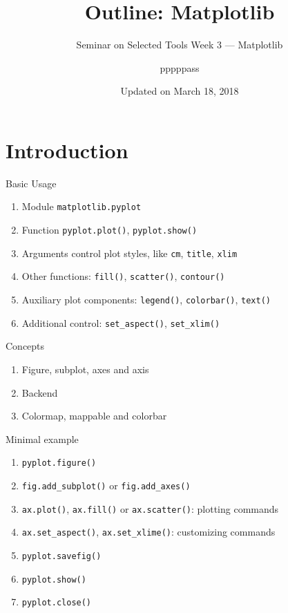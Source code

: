 \documentclass[english, nochinese]{../TeXTemplate/pkuslide}
\title{Outline: Matplotlib}
\subtitle{Seminar on Selected Tools Week 3 --- Matplotlib}
\author{pppppass}
\date{Updated on March 18, 2018}
\begin{document}
\begin{frame}
\titlepage
\end{frame}

\begin{frame}
\tableofcontents[subsectionstyle=show]
\end{frame}

\section{Introduction}

\begin{frame}
\sectionpage
\end{frame}

\begin{frame}[fragile]{Basic Usage}
\begin{enumerate}
\item Module \verb"matplotlib.pyplot"
\item Function \verb"pyplot.plot()", \verb"pyplot.show()"
\item Arguments control plot styles, like \verb"cm", \verb"title", \verb"xlim"
\item Other functions: \verb"fill()", \verb"scatter()", \verb"contour()"
\item Auxiliary plot components: \verb"legend()", \verb"colorbar()", \verb"text()"
\item Additional control: \verb"set_aspect()", \verb"set_xlim()"
\end{enumerate}
\end{frame}

\begin{frame}{Concepts}
\begin{enumerate}
\item Figure, subplot, axes and axis
\item Backend
\item Colormap, mappable and colorbar
\end{enumerate}
\end{frame}

\begin{frame}[fragile]{Minimal example}
\begin{enumerate}
\item \verb"pyplot.figure()"
\item \verb"fig.add_subplot()" or \verb"fig.add_axes()"
\item \verb"ax.plot()", \verb"ax.fill()" or \verb"ax.scatter()": plotting commands
\item \verb"ax.set_aspect()", \verb"ax.set_xlime()": customizing commands
\item \verb"pyplot.savefig()"
\item \verb"pyplot.show()"
\item \verb"pyplot.close()"
\end{enumerate}
\end{frame}
\end{document}
